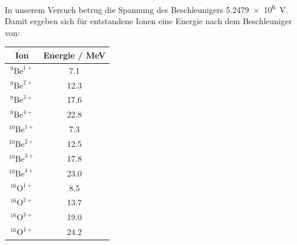 In unserem Versuch betrug die Spannung des Beschleunigers \SI{5.2479e6}{\volt}.
Damit ergeben sich für entstandene Ionen eine Energie nach dem Beschleuniger von:
\begin{center}
  \begin{tabular}{|c|c|}
    \hline
    Ion & Energie / \si{\mega\electronvolt} \\
    \hline
    $^{9}\text{Be}^{1+}$ & \num{7.1} \\
    $^{9}\text{Be}^{2+}$ & \num{12.3} \\
    $^{9}\text{Be}^{3+}$ & \num{17.6} \\
    $^{9}\text{Be}^{4+}$ & \num{22.8} \\
    \hline
    $^{10}\text{Be}^{1+}$ & \num{7.3} \\
    $^{10}\text{Be}^{2+}$ & \num{12.5} \\
    $^{10}\text{Be}^{3+}$ & \num{17.8} \\
    $^{10}\text{Be}^{4+}$ & \num{23.0} \\
    \hline
    $^{16}\text{O}^{1+}$ & \num{8.5} \\
    $^{16}\text{O}^{2+}$ & \num{13.7} \\
    $^{16}\text{O}^{3+}$ & \num{19.0} \\
    $^{16}\text{O}^{4+}$ & \num{24.2} \\
    \hline
  \end{tabular}
  \label{Auswertung_tab_Ionenenergien_nach_Besch}
\end{center}

